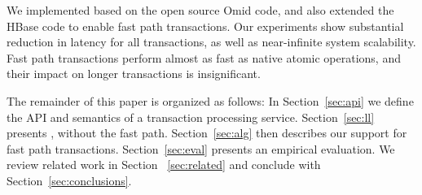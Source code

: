 We implemented {\sys\/} based on the open source Omid code, and also extended the HBase code to 
enable fast path transactions. Our experiments show substantial reduction in latency for all transactions, 
as well as near-infinite system scalability. Fast path transactions perform almost as fast as  
native atomic operations, and their impact on longer transactions is insignificant. 

The remainder of this paper is organized as follows:
In Section~\ref{sec:api} we define the  API and semantics of a transaction processing service. 
Section~\ref{sec:ll} presents \sys, without the fast path. 
Section~\ref{sec:alg} then describes our support for fast path  transactions.  
Section~\ref{sec:eval} presents an empirical evaluation.
We review related work in Section ~\ref{sec:related} and conclude with Section~\ref{sec:conclusions}.
